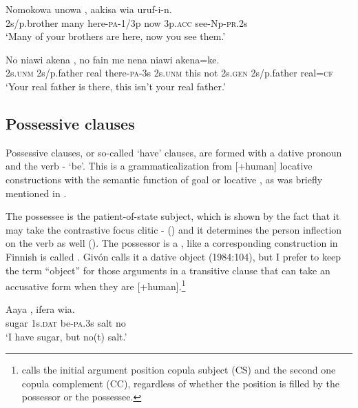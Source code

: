 \ea%
\label{ex:x1154}
\gll Nomokowa  unowa  ,  aakisa  wia  uruf-i-n.  \\
     2s/p.brother  many  here-\textsc{pa}-1/3p  now  3p.\textsc{acc}  see-Np-\textsc{pr}.2s \\
\glt `Many of your brothers are here, now you see them.'
\z

\ea%
\label{ex:x1155}
\gll No  niawi  akena  ,  no  fain me  nena  niawi  akena=ke. \\
     2s.\textsc{unm}  2s/p.father  real  there-\textsc{pa}-3s  2s.\textsc{unm}  this not  2s.\textsc{gen}  2s/p.father  real=\textsc{cf} \\
\glt `Your real father is there, this isn't your real father.'
\z

\subsection{Possessive clauses}
\hypertarget{RefHeading22141935131865}{}
Possessive clauses, or so-called `have' clauses, are formed with a dative pronoun and the verb - `be'. This is a grammaticalization from [+human] locative constructions with the semantic function of goal or locative \citep[50-61]{Heine1997}, as was briefly mentioned in .  

The possessee is the patient-of-state subject, which is shown by the fact that it may take the contrastive focus clitic - () and it determines the person inflection on the verb as well (). The possessor is a , like  a corresponding construction in Finnish is called \citep[209]{HakulinenEtAl1979}%
. Giv\'on calls it a dative object (1984:104), but I prefer to keep the term ``object'' for those arguments in a transitive clause that can take an accusative form when they are [+human].\footnote{\citet[302]{Dixon2010b} calls the initial argument position copula subject (CS) and the second one copula complement (CC), regardless of whether the position is filled by the possessor or the possessee.}

\ea%
\label{ex:x595}
\gll Aaya    ,  ifera  wia. \\
     sugar  1s.\textsc{dat}  be-\textsc{pa}.3s  salt  no \\
\glt `I have sugar, but no(t) salt.'
\z

